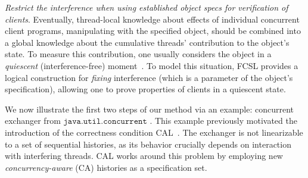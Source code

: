 \emph{Restrict the interference when using established object specs
  for verification of clients}.
%
Eventually, thread-local knowledge about effects of individual
concurrent client programs, manipulating with the specified object,
should be combined into a global knowledge about the cumulative
threads' contribution to the object's state.
%
To measure this contribution, one usually considers the object in a
\emph{quiescent} (interference-free) moment~\cite{Rinard:RACES}.
%
%
To model this situation, FCSL provides a logical construction for
\emph{fixing} interference (which is a parameter of the object's
specification), allowing one to prove properties of clients in a
quiescent state.
%
%





We now illustrate the first two steps of our method via an example:
concurrent exchanger from $\mathtt{java.util.concurrent}$
\cite{Scherer-al:SCOOL05,ExchangerClass}. This example previously
motivated the introduction of the correctness condition
CAL~\cite{Hemed-Rinetzky:PODC14}. The exchanger is not linearizable to
a set of sequential histories, as its behavior crucially depends on
interaction with interfering threads.
%
CAL works around this problem by employing new
\emph{concurrency-aware} (CA) histories as a specification set.


